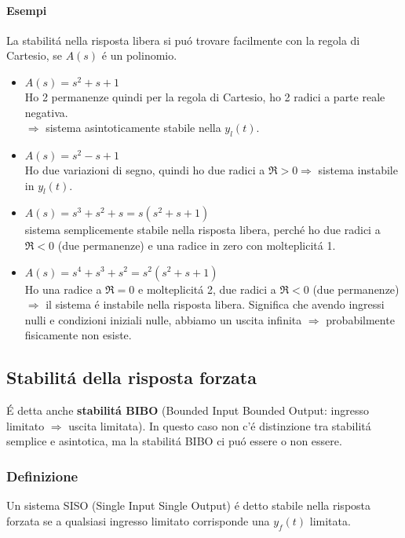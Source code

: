 \documentclass[../main.tex]{subfiles}
\begin{document}
		\begin{mdframed}[style=Esempio]
			\paragraph{Esempi}
			La stabilit\'{a} nella risposta libera si pu\'{o} trovare facilmente con la regola di Cartesio, se $ A(s) $ \'{e} un polinomio.
			\begin{itemize}
				\item 
					$ A(s) = s^2+s+1 $\\
					Ho 2 permanenze quindi per la regola di Cartesio, ho 2 radici a parte reale negativa.\\
					$ \Rightarrow $ sistema asintoticamente stabile nella $ y_l(t) $.
				\item 
					$ A(s) = s^2 - s + 1 $\\
					Ho due variazioni di segno, quindi ho due radici a $ \Re > 0 \Rightarrow $ sistema instabile in $ y_l(t) $.
					\item $ A(s) = s^3+s^2+s = s(s^2+s+1)$\\
					sistema semplicemente stabile nella risposta libera, perch\'{e} ho due radici a $ \Re < 0 $ (due permanenze) e una radice in zero con molteplicit\'{a} 1.
				\item
					$ A(s) = s^4+s^3+s^2 = s^2(s^2+s+1) $\\
					Ho una radice a $ \Re = 0 $ e molteplicit\'{a} 2, due radici a $ \Re < 0 $ (due permanenze) $ \Rightarrow $ il sistema \'{e} instabile nella risposta libera.
					Significa che avendo ingressi nulli e condizioni iniziali nulle, abbiamo un uscita infinita $ \Rightarrow $ probabilmente fisicamente non esiste. 
			\end{itemize}
		\end{mdframed}
		
	\subsection{Stabilit\'{a} della risposta forzata}
		\'{E} detta anche \textbf{stabilit\'{a} BIBO} (Bounded Input Bounded Output: ingresso limitato $ \Rightarrow $ uscita limitata). In questo caso non c'\'{e} distinzione tra stabilit\'{a} semplice e asintotica, ma la stabilit\'{a} BIBO ci pu\'{o} essere o non essere.
	
	\subsubsection{Definizione}
		Un sistema SISO (Single Input Single Output) \'{e} detto stabile nella risposta forzata se a qualsiasi ingresso limitato corrisponde una $ y_f(t) $ limitata.
	
\end{document}
